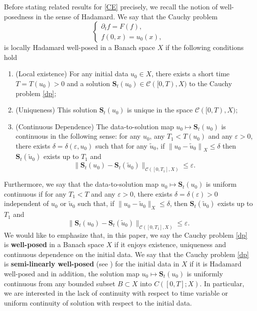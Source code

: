 \documentclass[12pt]{article}
\newcommand{\pa}{\partial}
\newcommand{\f}{\left}
\newcommand{\g}{\right}
\begin{document}
Before stating related results for \eqref{CE} precisely, we recall the notion of well-posedness in the sense of Hadamard. We say that the Cauchy problem
\begin{equation}\label{dp}
\begin{cases}
\pa_tf=F(f), \\
f(0,x)=u_0(x),
\end{cases}
\end{equation}
is locally Hadamard well-posed in a Banach space $X$ if the following conditions hold
\begin{enumerate}
  \item (Local existence)\; For any initial data $u_0\in X$, there exists a short time $T = T(u_0) > 0$ and a solution $\mathbf{S}_{t}(u_0)\in\mathcal{C}([0,T),X)$ to the Cauchy problem \eqref{dp};
  \item (Uniqueness)\; This solution $\mathbf{S}_{t}(u_0)$ is unique in the space $\mathcal{C}([0,T),X)$;
  \item (Continuous Dependence)\; The data-to-solution map $u_0 \mapsto \mathbf{S}_{t}(u_0)$ is continuous in the following
sense:  for any $u_0$, any $T_1< T\left(u_0\right)$ and any $\varepsilon>0$, there exists $\delta=\delta(\varepsilon,u_0)$ such that for any $\widetilde{u}_0$, if $\left\|u_0-\widetilde{u}_0\right\|_X \leq \delta$ then $\mathbf{S}_{t}(\widetilde{u}_0)$ exists up to $T_1$ and
$$\|\mathbf{S}_{t}(u_0)-\mathbf{S}_{t}(\widetilde{u}_0)\|_{\mathcal{C}([0,T_1],X)}\leq \varepsilon.$$
\end{enumerate}
Furthermore, we say that the data-to-solution map $u_0 \mapsto \mathbf{S}_{t}(u_0)$ is uniform continuous if for any $T_1 < T$ and any $\varepsilon > 0$, there exists $ \delta=\delta(\varepsilon)> 0$ independent of $u_0$ or $\widetilde{u}_0$ such that, if $\|u_0-\widetilde{u}_0\|_{X}\leq \delta$,
then $\mathbf{S}_{t}(\widetilde{u}_0)$ exists up to $T_1$ and
$$\|\mathbf{S}_{t}(u_0)-\mathbf{S}_{t}(\widetilde{u}_0)\|_{\mathcal{C}([0,T_1],X)}\leq \varepsilon.$$
We would like to emphasize that, in this paper, we say the Cauchy problem \eqref{dp} is {\bf well-posed} in a Banach space $X$ if it enjoys existence, uniqueness and continuous dependence on the initial data. We say that the Cauchy problem \eqref{dp} is {\bf semi-linearly well-posed} (see \cite{NT}) for the initial data in $X$ if it is Hadamard well-posed and in addition, the solution map $u_{0}\mapsto \mathbf{S}_{t}(u_0)$ is uniformly continuous from any bounded subset $B\subset X$ into $C\f([0,T];X\g)$. In particular, we are interested in the lack of continuity with respect to time variable or uniform continuity of solution with respect to the initial data.
\end{document}
